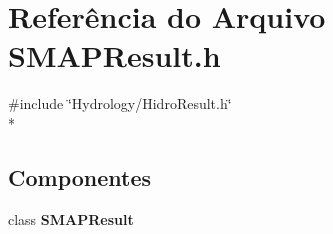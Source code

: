 \section{Referência do Arquivo S\+M\+A\+P\+Result.\+h}
\label{_s_m_a_p_result_8h}
{\ttfamily \#include \char`\"{}Hydrology/\+Hidro\+Result.\+h\char`\"{}}\\*
\subsection*{Componentes}
\begin{DoxyCompactItemize}
\item 
class {\bf S\+M\+A\+P\+Result}
\end{DoxyCompactItemize}
